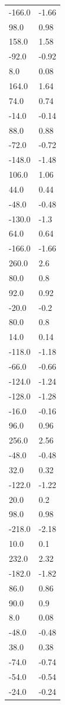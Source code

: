 \begin{longtable}{ll}
-166.0 & -1.66 \\
98.0 & 0.98 \\
158.0 & 1.58 \\
-92.0 & -0.92 \\
8.0 & 0.08 \\
164.0 & 1.64 \\
74.0 & 0.74 \\
-14.0 & -0.14 \\
88.0 & 0.88 \\
-72.0 & -0.72 \\
-148.0 & -1.48 \\
106.0 & 1.06 \\
44.0 & 0.44 \\
-48.0 & -0.48 \\
-130.0 & -1.3 \\
64.0 & 0.64 \\
-166.0 & -1.66 \\
260.0 & 2.6 \\
80.0 & 0.8 \\
92.0 & 0.92 \\
-20.0 & -0.2 \\
80.0 & 0.8 \\
14.0 & 0.14 \\
-118.0 & -1.18 \\
-66.0 & -0.66 \\
-124.0 & -1.24 \\
-128.0 & -1.28 \\
-16.0 & -0.16 \\
96.0 & 0.96 \\
256.0 & 2.56 \\
-48.0 & -0.48 \\
32.0 & 0.32 \\
-122.0 & -1.22 \\
20.0 & 0.2 \\
98.0 & 0.98 \\
-218.0 & -2.18 \\
10.0 & 0.1 \\
232.0 & 2.32 \\
-182.0 & -1.82 \\
86.0 & 0.86 \\
90.0 & 0.9 \\
8.0 & 0.08 \\
-48.0 & -0.48 \\
38.0 & 0.38 \\
-74.0 & -0.74 \\
-54.0 & -0.54 \\
-24.0 & -0.24 \\

\end{longtable}

